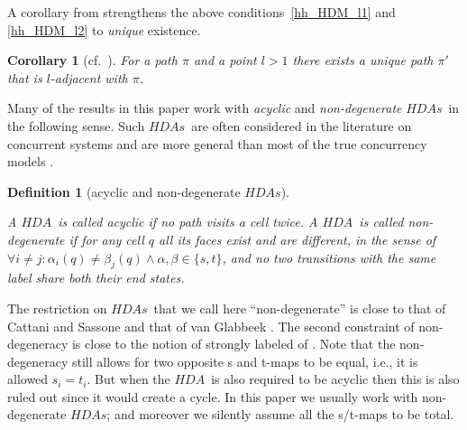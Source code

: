 \documentclass[submission,copyright,creativecommons]{eptcs}
\newtheorem{corollary}[theorem]{Corollary}
\newtheorem{definition}[theorem]{Definition}
\newcommand\HDA{\ensuremath{\mathit{HDA}}}
\newcommand\HDAs{\ensuremath{\mathit{HDAs}}}
\begin{document}
A corollary from \cite{Glabbeek06HDA} strengthens the above conditions~\ref{hh_HDM_l1} and \ref{hh_HDM_l2} to \textit{unique} existence.

\begin{corollary}[cf.~{\cite[sec.7.5]{Glabbeek06HDA}}]\label{cor_unique_adjacent}
For a path $\pi$ and a point $l>1$ there exists a unique path $\pi'$ that is $l$-adjacent with $\pi$.
\end{corollary}





Many of the results in this paper work with \emph{acyclic} and \emph{non-degenerate} \HDAs\ in the following sense. Such \HDAs\ are often considered in the literature on concurrent systems and are more general than most of the true concurrency models \cite{Pratt03trans_cancel,Glabbeek06HDA}.

\begin{definition}[acyclic and non-degenerate \HDAs]\label{def_acyclic}\ 

A \HDA\ is called \emph{acyclic} if no path visits a cell twice. 
A \HDA\ is called \emph{non-degenerate} if for any cell $q$ all its faces exist and are different, in the sense of $\forall i\neq j:\alpha_{i}(q)\neq\beta_{j}(q)\wedge\alpha,\beta\in\{s,t\}$, and no two transitions with the same label share both their end states.
\end{definition}

The restriction on \HDAs\ that we call here ``non-degenerate'' is close to that of Cattani and Sassone \cite[Def.2.2]{CattaniSassone96HDTS} and that of van Glabbeek \cite[p.10]{Glabbeek06HDA}. The second constraint of non-degeneracy is close to the notion of strongly labeled of \cite[Def.1.13]{Goubault12Category_Cubical}.
Note that the non-degeneracy still allows for two opposite s and t-maps to be equal, i.e., it is allowed $s_{i}=t_{i}$. But when the \HDA\ is also required to be acyclic then this is also ruled out since it would create a cycle.
In this paper we usually work with non-degenerate \HDAs; and moreover we silently assume all the s/t-maps to be total.
\end{document}
